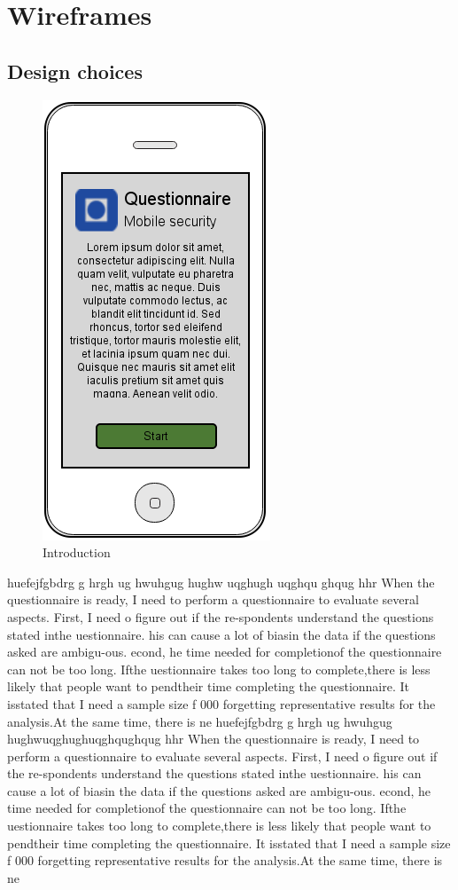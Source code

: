 \section{Wireframes}
\label{sec:wireframes}

  \subsection{Design choices}
    \begin{figure}
      \centering
      \vspace{-5pt}
      \includegraphics[scale=0.40]{screens/v3/mobile/mobile1-1.png}
      \caption{Introduction}
      \label{fig:wireframe1}
    \end{figure}
    huefejfgbdrg g hrgh ug hwuhgug hughw uqghugh uqghqu ghqug hhr When the questionnaire is ready, I need to perform a questionnaire to evaluate several aspects. First, I need o figure out if the re-spondents understand the questions stated inthe uestionnaire. his can cause a lot of biasin the data if the questions asked are ambigu-ous. econd, he time needed for completionof the questionnaire can not be too long. Ifthe uestionnaire takes too long to complete,there is less likely that people want to pendtheir time completing the questionnaire. It isstated that I need a sample size f 000 forgetting representative results for the analysis.At the same time, there is ne
    huefejfgbdrg g hrgh ug hwuhgug hughwuqghughuqghqughqug hhr When the questionnaire is ready, I need to perform a questionnaire to evaluate several aspects. First, I need o figure out if the re-spondents understand the questions stated inthe uestionnaire. his can cause a lot of biasin the data if the questions asked are ambigu-ous. econd, he time needed for completionof the questionnaire can not be too long. Ifthe uestionnaire takes too long to complete,there is less likely that people want to pendtheir time completing the questionnaire. It isstated that I need a sample size f 000 forgetting representative results for the analysis.At the same time, there is ne

